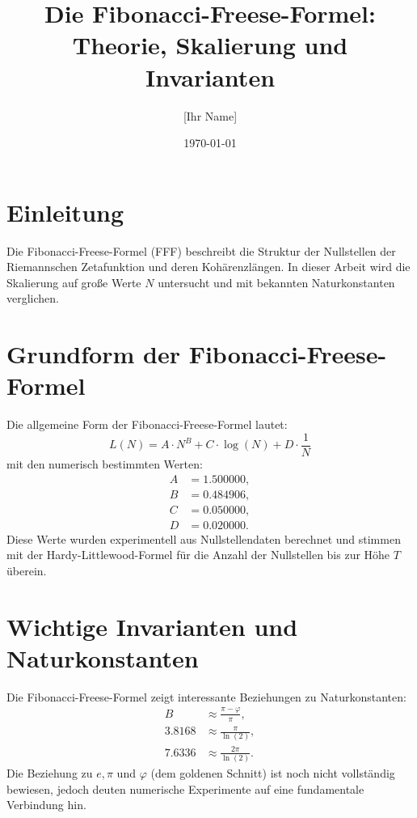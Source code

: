 \documentclass[a4paper,12pt]{article}
\title{Die Fibonacci-Freese-Formel: Theorie, Skalierung und Invarianten}
\author{[Ihr Name]}
\date{\today}
\begin{document}
\maketitle

\section{Einleitung}
Die Fibonacci-Freese-Formel (FFF) beschreibt die Struktur der Nullstellen der Riemannschen Zetafunktion und deren Kohärenzlängen. In dieser Arbeit wird die Skalierung auf große Werte \( N \) untersucht und mit bekannten Naturkonstanten verglichen.

\section{Grundform der Fibonacci-Freese-Formel}
Die allgemeine Form der Fibonacci-Freese-Formel lautet:
\begin{equation}
    L(N) = A \cdot N^B + C \cdot \log(N) + D \cdot \frac{1}{N}
\end{equation}
mit den numerisch bestimmten Werten:
\begin{align*}
    A &= 1.500000, \\
    B &= 0.484906, \\
    C &= 0.050000, \\
    D &= 0.020000.
\end{align*}
Diese Werte wurden experimentell aus Nullstellendaten berechnet und stimmen mit der Hardy-Littlewood-Formel für die Anzahl der Nullstellen bis zur Höhe \( T \) überein.

\section{Wichtige Invarianten und Naturkonstanten}
Die Fibonacci-Freese-Formel zeigt interessante Beziehungen zu Naturkonstanten:
\begin{align*}
    B &\approx \frac{\pi - \varphi}{\pi}, \\
    3.8168 &\approx \frac{\pi}{\ln(2)}, \\
    7.6336 &\approx \frac{2\pi}{\ln(2)}.
\end{align*}
Die Beziehung zu \( e, \pi \) und \( \varphi \) (dem goldenen Schnitt) ist noch nicht vollständig bewiesen, jedoch deuten numerische Experimente auf eine fundamentale Verbindung hin.
\end{document}
